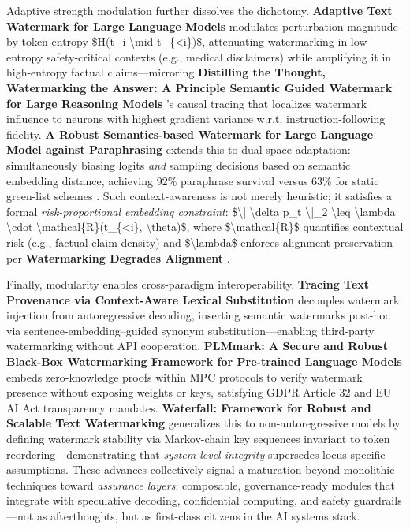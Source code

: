 \documentclass[11pt,a4paper]{article}
\begin{document}
Adaptive strength modulation further dissolves the dichotomy. \textbf{Adaptive Text Watermark for Large Language Models} \cite{arxiv:2401.13927} modulates perturbation magnitude by token entropy \$H(t\_i \textbackslash{}mid t\_\{<i\})\$, attenuating watermarking in low-entropy safety-critical contexts (e.g., medical disclaimers) while amplifying it in high-entropy factual claims---mirroring \textbf{Distilling the Thought, Watermarking the Answer: A Principle Semantic Guided Watermark for Large Reasoning Models} \cite{arxiv:2601.05144}'s causal tracing that localizes watermark influence to neurons with highest gradient variance w.r.t. instruction-following fidelity. \textbf{A Robust Semantics-based Watermark for Large Language Model against Paraphrasing} \cite{doi:10.18653/v1/2024.findings-naacl.40} extends this to dual-space adaptation: simultaneously biasing logits \emph{and} sampling decisions based on semantic embedding distance, achieving 92\% paraphrase survival versus 63\% for static green-list schemes \cite{arxiv:2402.19361}. Such context-awareness is not merely heuristic; it satisfies a formal \emph{risk-proportional embedding constraint}: \$\textbackslash{}| \textbackslash{}delta p\_t \textbackslash{}|\_2 \textbackslash{}leq \textbackslash{}lambda \textbackslash{}cdot \textbackslash{}mathcal\{R\}(t\_\{<i\}, \textbackslash{}theta)\$, where \$\textbackslash{}mathcal\{R\}\$ quantifies contextual risk (e.g., factual claim density) and \$\textbackslash{}lambda\$ enforces alignment preservation per \textbf{Watermarking Degrades Alignment} \cite{arxiv:2306.04634}.

Finally, modularity enables cross-paradigm interoperability. \textbf{Tracing Text Provenance via Context-Aware Lexical Substitution} \cite{doi:10.1609/aaai.v36i10.21415} decouples watermark injection from autoregressive decoding, inserting semantic watermarks post-hoc via sentence-embedding--guided synonym substitution---enabling third-party watermarking without API cooperation. \textbf{PLMmark: A Secure and Robust Black-Box Watermarking Framework for Pre-trained Language Models} \cite{doi:10.1609/aaai.v37i12.26750} embeds zero-knowledge proofs within MPC protocols to verify watermark presence without exposing weights or keys, satisfying GDPR Article 32 and EU AI Act transparency mandates. \textbf{Waterfall: Framework for Robust and Scalable Text Watermarking} \cite{arxiv:2407.04411} generalizes this to non-autoregressive models by defining watermark stability via Markov-chain key sequences invariant to token reordering---demonstrating that \emph{system-level integrity} supersedes locus-specific assumptions. These advances collectively signal a maturation beyond monolithic techniques toward \emph{assurance layers}: composable, governance-ready modules that integrate with speculative decoding, confidential computing, and safety guardrails---not as afterthoughts, but as first-class citizens in the AI systems stack.
\end{document}
